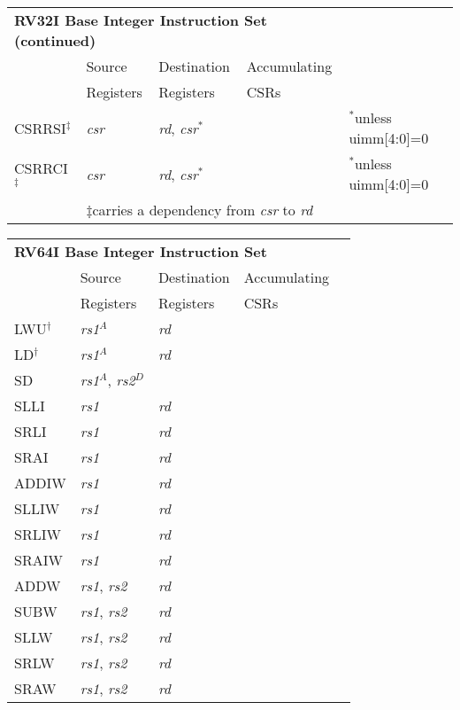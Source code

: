 \begin{tabular}{p{3cm}|p{25mm}|p{3cm}|p{4cm}|p{4cm}}
  \multicolumn{4}{l}{\bf RV32I Base Integer Instruction Set (continued)} \\
  \cline{2-4}
   & Source    & Destination & Accumulating \\
   & Registers & Registers   & CSRs \\
   \cline{2-4}
   CSRRSI$^\ddagger$ & {\em csr} & {\em rd}, {\em csr}$^*$ & & $^*$unless uimm[4:0]=0  \\
   \cline{2-4}
   CSRRCI$^\ddagger$ & {\em csr} & {\em rd}, {\em csr}$^*$ & & $^*$unless uimm[4:0]=0  \\
   \cline{2-4}
   \multicolumn{1}{c}{} & \multicolumn{3}{l}{$\ddagger$carries a dependency from {\em csr} to {\em rd}}
\end{tabular}

\begin{tabular}{p{3cm}|p{25mm}|p{3cm}|p{4cm}|p{4cm}}
  \multicolumn{4}{l}{\bf RV64I Base Integer Instruction Set} \\
  \cline{2-4}
   & Source    & Destination & Accumulating \\
   & Registers & Registers   & CSRs \\
  \cline{2-4}
   LWU$^\dagger$ & {\em rs1}$^A$ & {\em rd} &   & \\
   \cline{2-4}
   LD$^\dagger$ & {\em rs1}$^A$ & {\em rd} &   & \\
   \cline{2-4}
   SD & {\em rs1}$^A$, {\em rs2}$^D$ &  &   & \\
   \cline{2-4}
   SLLI & {\em rs1} & {\em rd} &   & \\
   \cline{2-4}
   SRLI & {\em rs1} & {\em rd} &   & \\
   \cline{2-4}
   SRAI & {\em rs1} & {\em rd} &   & \\
   \cline{2-4}
   ADDIW & {\em rs1} & {\em rd} &   & \\
   \cline{2-4}
   SLLIW & {\em rs1} & {\em rd} &   & \\
   \cline{2-4}
   SRLIW & {\em rs1} & {\em rd} &   & \\
   \cline{2-4}
   SRAIW & {\em rs1} & {\em rd} &   & \\
   \cline{2-4}
   ADDW & {\em rs1}, {\em rs2} & {\em rd} &   & \\
   \cline{2-4}
   SUBW & {\em rs1}, {\em rs2} & {\em rd} &   & \\
   \cline{2-4}
   SLLW & {\em rs1}, {\em rs2} & {\em rd} &   & \\
   \cline{2-4}
   SRLW & {\em rs1}, {\em rs2} & {\em rd} &   & \\
   \cline{2-4}
   SRAW & {\em rs1}, {\em rs2} & {\em rd} &   & \\
   \cline{2-4}
\end{tabular}

